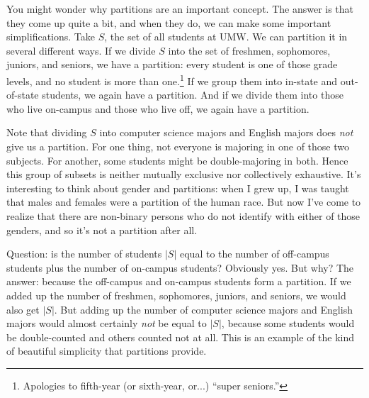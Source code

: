 You might wonder why partitions are an important concept. The answer is
that they come up quite a bit, and when they do, we can make some important
simplifications. Take $S$, the set of all students at UMW. We can partition
it in several different ways. If we divide $S$ into the set of freshmen,
sophomores, juniors, and seniors, we have a partition: every student is one of
those grade levels, and no student is more than one.\footnote{Apologies to
fifth-year (or sixth-year, or...) ``super seniors.''} If we group them into
in-state and out-of-state students, we again have a partition. And if we divide
them into those who live on-campus and those who live off, we again have a
partition.

Note that dividing $S$ into computer science majors and English majors does
\textit{not} give us a partition. For one thing, not everyone is majoring in
one of those two subjects. For another, some students might be double-majoring
in both. Hence this group of subsets is neither mutually exclusive nor
collectively exhaustive. It's interesting to think about gender and partitions:
when I grew up, I was taught that males and females were a partition of the
human race. But now I've come to realize that there are non-binary persons who
do not identify with either of those genders, and so it's not a partition after
all.


Question: is the number of students $|S|$  equal to the number of off-campus
students plus the number of on-campus students? Obviously yes. But why? The
answer: because the off-campus and on-campus students form a partition. If we
added up the number of freshmen, sophomores, juniors, and seniors, we would
also get $|S|$. But adding up the number of computer science majors and English
majors would almost certainly \textit{not} be equal to $|S|$, because some
students would be double-counted and others counted not at all. This is an
example of the kind of beautiful simplicity that partitions provide.

